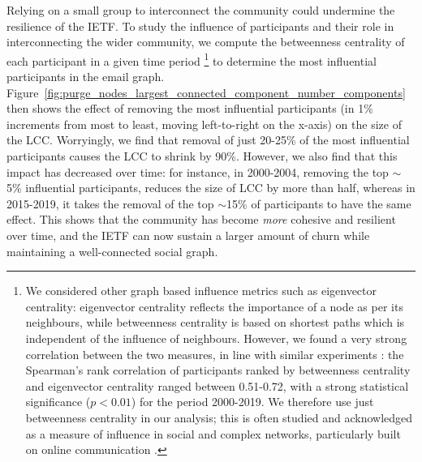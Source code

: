 \documentclass[twocolumn,10pt]{article}
\newcommand{\pb}[1]{\vspace{0.75ex}\noindent{\textbf{#1}}}
\begin{document}
\pb{Influence:}
Relying on a small group to interconnect the community could undermine the
resilience of the IETF.  To study the influence of participants and their
role in interconnecting the wider community, we compute the betweenness
centrality of each participant in a given time period
\cite{kourtellis2013identifying,weitzel2012measuring,sole2014centrality}%
\footnote{
  We considered other graph based influence metrics such as eigenvector
  centrality: eigenvector centrality reflects the importance of a node as
  per its neighbours, while betweenness centrality is based on shortest
  paths which is independent of the influence of neighbours.  However, we
  found a very strong correlation between the two measures, in line with
  similar experiments \cite{valente2008correlated,he2016correlation}: the
  Spearman's rank correlation of participants ranked by betweenness
  centrality and eigenvector centrality ranged between 0.51-0.72, with a
  strong statistical significance ($p < 0.01$) for the period 2000-2019. We
  therefore use just betweenness centrality in our analysis; this is often
  studied and acknowledged as a measure of influence in social and complex
  networks, particularly built on online communication
  \cite{hagen2018crisis,chen2012identifying, ghalmane2019centrality}.
}
to determine the most influential participants in the email graph.
Figure~\ref{fig:purge_nodes_largest_connected_component_number_components}
then shows the effect of removing the most influential participants (in 1\%
increments from most to least, moving left-to-right on the x-axis) on the
size of the LCC.  Worryingly, we find that removal of just 20-25\% of the
most influential participants causes the LCC to shrink by 90\%.  However,
we also find that this impact has decreased over time: for instance, in
2000-2004, removing the top $\sim$5\% influential participants, reduces the
size of LCC by more than half, whereas in 2015-2019, it takes the removal
of the top $\sim$15\% of participants to have the same effect.  This shows
that the community has become \emph{more} cohesive and resilient over time,
and the IETF can now sustain a larger amount of churn while maintaining a
well-connected social graph.
\end{document}
